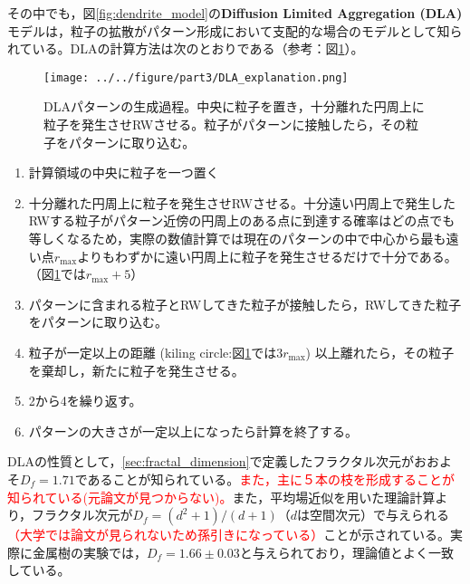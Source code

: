 \documentclass[autodetect-engine,dvi=dvipdfmx,a4paper,ja=standard,oneside,openany,11pt]{bxjsbook}
\begin{document}
その中でも，図\ref{fig:dendrite_model}の\textbf{Diffusion Limited Aggregation (DLA)}モデル\cite{witten1981diffusion}は，粒子の拡散がパターン形成において支配的な場合のモデルとして知られている。DLAの計算方法は次のとおりである（参考：図\ref{fig:DLA_explanation}\cite{松下貢1987dla}）。

\begin{figure}[htbp]
  \centering
  \texttt{[image: ../../figure/part3/DLA\_explanation.png]}
  \caption{DLAパターンの生成過程。中央に粒子を置き，十分離れた円周上に粒子を発生させRWさせる。粒子がパターンに接触したら，その粒子をパターンに取り込む。}
  \label{fig:DLA_explanation}
\end{figure}

\begin{enumerate}
  \item 計算領域の中央に粒子を一つ置く
  \item 十分離れた円周上に粒子を発生させRWさせる。十分遠い円周上で発生したRWする粒子がパターン近傍の円周上のある点に到達する確率はどの点でも等しくなるため，実際の数値計算では現在のパターンの中で中心から最も遠い点$r_\mathrm{max}$よりもわずかに遠い円周上に粒子を発生させるだけで十分である。（図\ref{fig:DLA_explanation}では$r_{\mathrm{max}}+5$）
  \item パターンに含まれる粒子とRWしてきた粒子が接触したら，RWしてきた粒子をパターンに取り込む。
  \item 粒子が一定以上の距離 (kiling circle:図\ref{fig:DLA_explanation}では$3r_{\mathrm{max}}$) 以上離れたら，その粒子を棄却し，新たに粒子を発生させる。
  \item 2から4を繰り返す。
  \item パターンの大きさが一定以上になったら計算を終了する。
\end{enumerate}

DLAの性質として，\ref{sec:fractal_dimension}で定義したフラクタル次元がおおよそ$D_f=1.71$であることが知られている\cite{太田正之輔2009dla}。\textcolor{red}{また，主に５本の枝を形成することが知られている(元論文が見つからない)。}また，平均場近似を用いた理論計算より，フラクタル次元が$D_f=(d^2+1)/(d+1)$（$d$は空間次元）で与えられる\cite{muthukumar1983mean}\textcolor{red}{\cite{tokuyama1984fractal}（大学では論文が見られないため孫引きになっている）}ことが示されている。実際に金属樹の実験\cite{matsushita1984fractal}では，$D_f=1.66\pm0.03$と与えられており，理論値とよく一致している。
\end{document}
